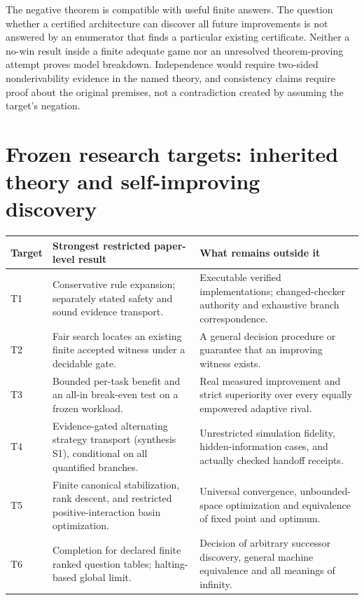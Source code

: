 \documentclass[11pt,letterpaper]{article}
\theoremstyle{definition}
\theoremstyle{remark}
\begin{document}
The negative theorem is compatible with useful finite answers. The question whether a certified architecture can discover all future improvements is not answered by an enumerator that finds a particular existing certificate. Neither a no-win result inside a finite adequate game nor an unresolved theorem-proving attempt proves model breakdown. Independence would require two-sided nonderivability evidence in the named theory, and consistency claims require proof about the original premises, not a contradiction created by assuming the target's negation.

\section{Frozen research targets: inherited theory and self-improving discovery}
\small
\begin{longtable}{p{}p{}p{}}
\toprule Target & Strongest restricted paper-level result & What remains outside it \\\midrule\endhead
T1 & Conservative rule expansion; separately stated safety and sound evidence transport. & Executable verified implementations; changed-checker authority and exhaustive branch correspondence.\\
T2 & Fair search locates an existing finite accepted witness under a decidable gate. & A general decision procedure or guarantee that an improving witness exists.\\
T3 & Bounded per-task benefit and an all-in break-even test on a frozen workload. & Real measured improvement and strict superiority over every equally empowered adaptive rival.\\
T4 & Evidence-gated alternating strategy transport (synthesis S1), conditional on all quantified branches. & Unrestricted simulation fidelity, hidden-information cases, and actually checked handoff receipts.\\
T5 & Finite canonical stabilization, rank descent, and restricted positive-interaction basin optimization. & Universal convergence, unbounded-space optimization and equivalence of fixed point and optimum.\\
T6 & Completion for declared finite ranked question tables; halting-based global limit. & Decision of arbitrary successor discovery, general machine equivalence and all meanings of infinity.\\\bottomrule
\end{longtable}
\normalsize
\end{document}
